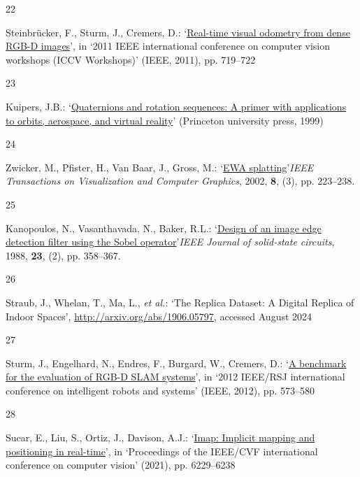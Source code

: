 \documentclass[twocolumn]{article} %
\newlength{\cslhangindent}
\newlength{\csllabelwidth}
\newenvironment{CSLReferences}[2] %
{\begin{list}{}{%
  \setlength{\itemindent}{0pt}
  \setlength{\leftmargin}{0pt}
  \setlength{\parsep}{0pt}
  \ifodd #1
  \setlength{\leftmargin}{\cslhangindent}
  \setlength{\itemindent}{-1\cslhangindent}
  \fi
  \setlength{\itemsep}{0.5\baselineskip}}}
{\end{list}}
\newcommand{\CSLLeftMargin}[1]{\parbox[t]{\csllabelwidth}{\strut#1\strut}}
\newcommand{\CSLRightInline}[1]{\parbox[t]{\linewidth - \csllabelwidth}{\strut#1\strut}}
\begin{document}
\begin{CSLReferences}{0}{1}
\CSLLeftMargin{22 }%
\CSLRightInline{Steinbrücker, F., Sturm, J., Cremers, D.:
{`\href{https://doi.org/10.1109/ICCVW.2011.6130321}{Real-time visual
odometry from dense {RGB-D} images}'}, in {`2011 {IEEE} international
conference on computer vision workshops ({ICCV Workshops})'} (IEEE,
2011), pp. 719--722}

\CSLLeftMargin{23 }%
\CSLRightInline{Kuipers, J.B.:
{`\href{https://books.google.com/books?hl=en&lr=&id=_Og9DwAAQBAJ&oi=fnd&pg=PR21&dq=kuipers+Quaternions+Rotation+Sequences+1999&ots=t3I3ky6Zut&sig=o3xQEsvNHM-t2AIySNcaxBhSc_I}{Quaternions
and rotation sequences: A primer with applications to orbits, aerospace,
and virtual reality}'} (Princeton university press, 1999)}

\CSLLeftMargin{24 }%
\CSLRightInline{Zwicker, M., Pfister, H., Van Baar, J., Gross, M.:
{`\href{https://doi.org/10.1109/TVCG.2002.1021576}{{EWA}
splatting}'}\emph{IEEE Transactions on Visualization and Computer
Graphics}, 2002, \textbf{8}, (3), pp. 223--238. }

\CSLLeftMargin{25 }%
\CSLRightInline{Kanopoulos, N., Vasanthavada, N., Baker, R.L.:
{`\href{https://doi.org/10.1109/4.996}{Design of an image edge detection
filter using the {Sobel} operator}'}\emph{IEEE Journal of solid-state
circuits}, 1988, \textbf{23}, (2), pp. 358--367. }

\CSLLeftMargin{26 }%
\CSLRightInline{Straub, J., Whelan, T., Ma, L., \emph{et al.}: {`The
{Replica Dataset}: {A Digital Replica} of {Indoor Spaces}'},
\url{http://arxiv.org/abs/1906.05797}, accessed August 2024}

\CSLLeftMargin{27 }%
\CSLRightInline{Sturm, J., Engelhard, N., Endres, F., Burgard, W.,
Cremers, D.: {`\href{https://doi.org/10.1109/IROS.2012.6385773}{A
benchmark for the evaluation of {RGB-D SLAM} systems}'}, in {`2012
{IEEE}/{RSJ} international conference on intelligent robots and
systems'} (IEEE, 2012), pp. 573--580}

\CSLLeftMargin{28 }%
\CSLRightInline{Sucar, E., Liu, S., Ortiz, J., Davison, A.J.:
{`\href{http://openaccess.thecvf.com/content/ICCV2021/html/Sucar_iMAP_Implicit_Mapping_and_Positioning_in_Real-Time_ICCV_2021_paper.html}{Imap:
{Implicit} mapping and positioning in real-time}'}, in {`Proceedings of
the {IEEE}/{CVF} international conference on computer vision'} (2021),
pp. 6229--6238}

\end{CSLReferences}
\end{document}
